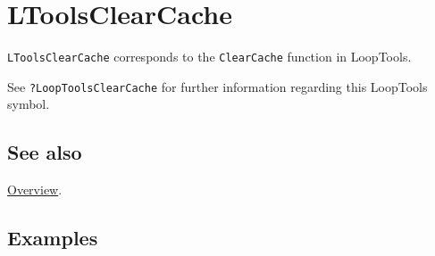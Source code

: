 \documentclass[../FeynHelpersManual.tex]{subfiles}
\begin{document}
\hypertarget{ltoolsclearcache}{
\section{LToolsClearCache}\label{ltoolsclearcache}}

\texttt{LToolsClearCache} corresponds to the \texttt{ClearCache}
function in LoopTools.

See \texttt{?LoopTools\textasciigrave ClearCache} for further
information regarding this LoopTools symbol.

\subsection{See also}

\hyperlink{toc}{Overview}.

\subsection{Examples}
\end{document}
